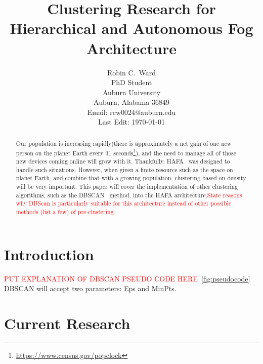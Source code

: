 \documentclass[letterpaper,twocolumn,10pt]{article}
\newcommand\todo[1]{\textcolor{red}{#1}}
\begin{document}
\title{\Large \bf Clustering Research for Hierarchical and Autonomous Fog Architecture}

\author{
{\rm Robin C.\ Ward}\\
PhD Student\\
Auburn University\\
Auburn, Alabama 36849\\
Email: rcw0024@auburn.edu\\
Last Edit: \today
}

\maketitle

\begin{abstract}
Our population is increasing rapidly(there is approximately a net gain of one new person on the planet Earth every 31 seconds\footnote{\url{https://www.census.gov/popclock}}), and the need to manage all of those new devices coming online will grow with it. Thankfully, HAFA~\cite{10.1145/3229710.3229740} was designed to handle such situations. However, when given a finite resource such as the space on planet Earth, and combine that with a growing population, clustering based on density will be very important. This paper will cover the implementation of other clustering algorithms, such as the DBSCAN~\cite{10.5555/3001460.3001507} method, into the HAFA architecture.\todo{State reasons why DBScan is particularly suitable for this architecture instead of other possible methods (list a few) of pre-clustering.}
\end{abstract}

\section{Introduction}
\todo{PUT EXPLANATION OF DBSCAN PSEUDO CODE HERE}~\ref{fig:pseudocode}
DBSCAN will accept two parameters: Eps and MinPts.

\section{Current Research}
\end{document}
